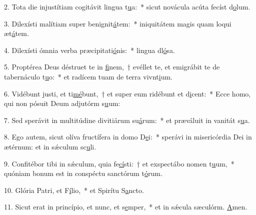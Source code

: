 2. Tota die injustítiam cogitávit lingua t\uline{u}a:~* sicut novácula acúta fecíst d\uline{o}lum.\par 
3. Dilexísti malítiam super benignit\uline{á}tem:~* iniquitátem magis quam loqui æt\uline{á}tem.\par 
4. Dilexísti ómnia verba præcipitati\uline{ó}nis:~* lingua dl\uline{ó}sa.\par 
5. Proptérea Deus déstruet te in \uline{fi}nem,~† evéllet te, et emigrábit te de tabernáculo t\uline{u}o:~* et radícem tuam de terra vivnt\uline{i}um.\par 
6. Vidébunt justi, et ti\uline{mé}bunt,~† et super eum ridébunt et d\uline{i}cent:~* Ecce homo, qui non pósuit Deum adjutórm s\uline{u}um:\par 
7. Sed sperávit in multitúdine divitiárum su\uline{á}rum:~* et præváluit in vanitát s\uline{u}a.\par 
8. Ego autem, sicut olíva fructífera in domo D\uline{e}i:~* sperávi in misericórdia Dei in ætérnum: et in sǽculum sc\uline{u}li.\par 
9. Confitébor tibi in sǽculum, quia fe\uline{cí}sti:~† et exspectábo nomen t\uline{u}um,~* quóniam bonum est in conspéctu sanctórum t\uline{ó}rum.\par 
10. Glória Patri, et F\uline{í}lio,~* et Spirítu S\uline{a}ncto.\par 
11. Sicut erat in princípio, et nunc, et s\uline{e}mper,~* et in sǽcula sæculórm. \uline{A}men.\par 
